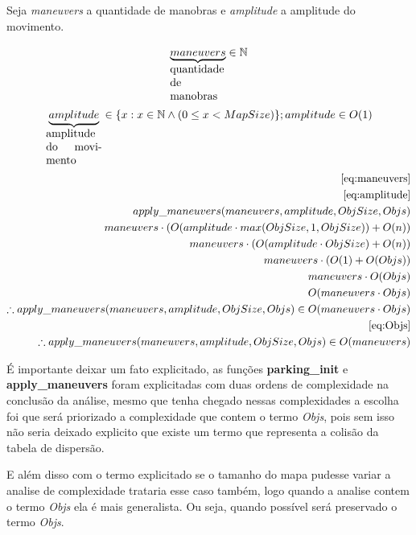 \documentclass[11pt]{article}
\begin{document}
Seja \emph{maneuvers} a quantidade de manobras e \emph{amplitude} a amplitude do movimento.

\begin{equation}\label{eq:maneuvers}
\underbrace{maneuvers}_{\parbox{1.75cm}{ quantidade de manobras}}\in \mathbb{N}\\
\end{equation}
\begin{equation}\label{eq:amplitude}
\underbrace{amplitude}_{\parbox{1.75cm}{ amplitude do movimento}}\in \{x : x \in \mathbb{N} \land (0 \leq x < MapSize)\};\\
amplitude \in O(1)\\
\end{equation}
\begin{equation}
\begin{aligned}
\eqref{eq:maneuvers}\\
\eqref{eq:amplitude}\\
apply\_maneuvers(maneuvers,amplitude,ObjSize,Objs)\\
maneuvers\cdot (O(amplitude\cdot max(ObjSize,1,ObjSize))+O(n))\\
maneuvers\cdot (O(amplitude\cdot ObjSize)+O(n))\\
maneuvers\cdot (O(1)+O(Objs))\\
maneuvers\cdot O(Objs)\\
O(maneuvers\cdot Objs)\\
\therefore apply\_maneuvers(maneuvers,amplitude,ObjSize,Objs) \in O(maneuvers\cdot Objs)\\
\eqref{eq:Objs}\\
\therefore apply\_maneuvers(maneuvers,amplitude,ObjSize,Objs) \in O(maneuvers)\\
\end{aligned}
\end{equation}

É importante deixar um fato explicitado, as funções \textbf{parking\_init} e \textbf{apply\_maneuvers} foram explicitadas com duas ordens de complexidade na conclusão da análise, mesmo que tenha chegado nessas complexidades a escolha foi que será priorizado a complexidade que contem o termo \emph{Objs}, pois sem isso não seria deixado explicito que existe um termo que representa a colisão da tabela de dispersão.

E além disso com o termo explicitado se o tamanho do mapa pudesse variar a analise de complexidade trataria esse caso também, logo quando a analise contem o termo \emph{Objs} ela é mais generalista. Ou seja, quando possível será preservado o termo \emph{Objs}.
\end{document}
